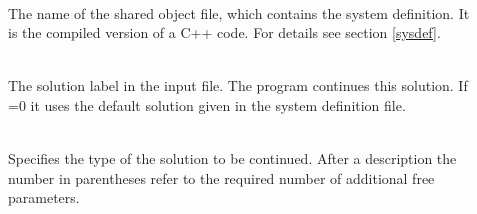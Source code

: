 \documentclass[10pt,a4paper]{ddedoc}
\begin{document}
\begin{description}
\item[] ~\\
The name of the shared object file,
which contains the system definition. It is the compiled version of a C++
code. For details see section \ref{sysdef}.
%
\item[] ~\\
The solution label in the input file. The program continues this
solution. If =0 it uses the default solution given in the system
definition file.
%
\item[] ~\\
Specifies the type of the solution to be continued. After a description the number in parentheses refer to the required number of additional free parameters.


\end{description}
\end{document}
